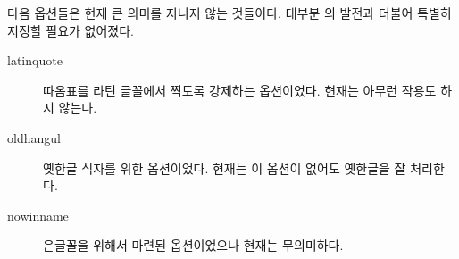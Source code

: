 \documentclass[
	12pt,
	a4paper,
	kosection,
	footnote,
	microtype,
	figtabcapt,
]{oblivoir}
\newcommand\obclass{ob\-liv\-oir\oblivoirallowbreak}
\begin{document}
\bigskip

다음 옵션들은 현재 큰 의미를 지니지 않는 것들이다. 대부분 \koTeX 의 발전과 더불어  특별히 지정할 필요가 없어졌다.
\begin{description}
\item [latinquote] 따옴표를 라틴 글꼴에서 찍도록 강제하는 옵션이었다. 현재는 아무런 작용도 하지 않는다.
\item [oldhangul] 옛한글 식자를 위한 옵션이었다. 현재는 이 옵션이 없어도 옛한글을 잘 처리한다.
\item [nowinname] 은글꼴을 위해서 마련된 옵션이었으나 현재는 무의미하다.
\end{description}


\end{document}
